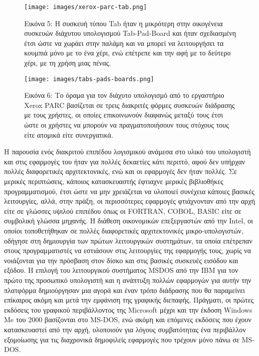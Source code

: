 \documentclass[
]{article}
\begin{document}
\leavevmode{}%
\begin{figure}
\hypertarget{fig:xerox-parc-tab}{%
\centering
\texttt{[image: images/xerox-parc-tab.png]}
\caption{Εικόνα 5: Η συσκευή τύπου Tab ήταν η μικρότερη στην οικογένεια
συσκευών διάχυτου υπολογισμού Tab-Pad-Board και ήταν σχεδιασμένη έτσι
ώστε να χωράει στην παλάμη και να μπορεί να λειτουργήσει τα κουμπιά μόνο
με το ένα χέρι, ενώ επέτρεπε και την αφή με το δεύτερο χέρι, με τη χρήση
μιας πένας.}\label{fig:xerox-parc-tab}
}
\end{figure}

\leavevmode{}%
\begin{figure}
\hypertarget{fig:tabs-pads-boards}{%
\centering
\texttt{[image: images/tabs-pads-boards.png]}
\caption{Εικόνα 6: Το όραμα για τον διάχυτο υπολογισμό από το εργαστήριο
Xerox PARC βασίζεται σε τρεις διακριτές φόρμες συσκευών διάδρασης με
τους χρήστες, οι οποίες επικοινωνούν διαφανώς μεταξύ τους έτσι ώστε οι
χρήστες να μπορούν να πραγματοποιήσουν τους στόχους τους είτε ατομικά
είτε συνεργατικά.}\label{fig:tabs-pads-boards}
}
\end{figure}

Η παρουσία ενός διακριτού επιπέδου λογισμικού ανάμεσα στο υλικό του
υπολογιστή και στις εφαρμογές του ήταν για πολλές δεκαετίες κάτι
περιττό, αφού δεν υπήρχαν πολλές διαφορετικές αρχιτεκτονικές, ενώ και οι
εφαρμογές δεν ήταν πολλές. Σε μερικές περιπτώσεις, κάποιος κατασκευαστής
έφτιαχνε μερικές βιβλιοθήκες προγραμματισμού, έτσι ώστε να μην
χρειάζεται να υλοποιεί συνέχεια κάποιες βασικές λειτουργίες, αλλά, στην
πράξη, οι περισσότερες εφαρμογές φτιάχνονταν από την αρχή είτε σε
γλώσσες υψιλού επιπέδου όπως οι FORTRAN, COBOL, BASIC είτε σε συμβολική
γλώσσα μηχανής. Η διάθεση οικονομικών επεξεργαστών από την Intel, οι
οποίοι τοποθετήθηκαν σε πολλές διαφορετικές αρχιτεκτονικές
μικρο-υπολογιστών, οδήγησε στη δημιουργία των πρώτων λειτουργικών
συστημάτων, τα οποία επέτρεπαν στους προγραμματιστές να εστιάσουν στις
λειτουργίες της εφαρμογής τους, χωρίς να νοιάζονται για την πρόσβαση
στον δίσκο και στις βασικές συσκευές εισόδου και εξόδου. Η επιλογή του
λειτουργικού συστήματος MSDOS από την IBM για τον πρώτο της προσωπικό
υπολογιστή και η ανάπτυξη πολλών εφαρμογών για αυτήν την πλατφόρμα
δημιούργησαν μια αγορά και έναν τρόπο διάδρασης που θα παραμείνει
επίκαιρος ακόμη και μετά την εμφάνιση της γραφικής διεπαφής. Πράγματι,
οι πρώτες εκδόσεις του γραφικού περιβάλλοντος της Microsoft μέχρι και
την έκδοση Windows Me του 2000 βασίζονται στο MS-DOS, ενώ ακόμη και
επόμενες εκδόσεις που έχουν κατασκευαστεί από την αρχή, υλοποιούν για
λόγους συμβατότητας ένα περιβάλλον εξομοίωσης για τις διαχρονικά
δημοφιλείς εφαρμογές που τρέχουν μόνο πάνω σε MS-DOS.
\end{document}
